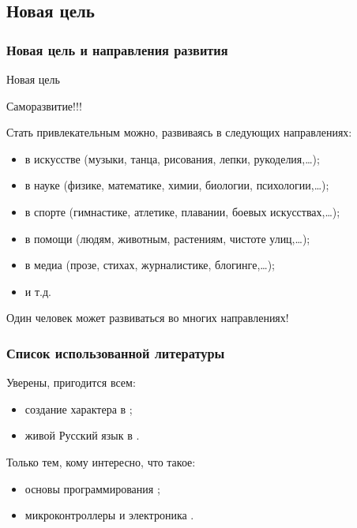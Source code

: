     
\subsection{Новая цель}

\begin{frame}
    \frametitle{Новая цель и направления развития}
    
    \begin{block}{Новая цель}
        \begin{center}
            \alert{Саморазвитие}!!!
        \end{center}
    \end{block}
    
    Стать \alert{привлекательным} можно, развиваясь в следующих направлениях:
    \begin{itemize}
        \item в искусстве (музыки, танца, рисования, лепки, рукоделия,\ldots);
        \item в науке (физике, математике, химии, биологии, психологии,\ldots);
        \item в спорте (гимнастике, атлетике, плавании, боевых искусствах,\ldots);
        \item в помощи (людям, животным, растениям, чистоте улиц,\ldots);
        \item в медиа (прозе, стихах, журналистике, блогинге,\ldots);
        \item и т.д.
    \end{itemize}
    
    \begin{block}{}
        \begin{center}
            \alert{Один} человек может развиваться во \alert{многих} направлениях!
        \end{center}
    \end{block}
    
\end{frame}


\appendix

\begin{frame}
    \frametitle{Список использованной литературы}

    Уверены, пригодится \alert{всем}:
    \begin{itemize}
        \item создание характера в \cite{bib:kovey:sevenHabits};
        \item живой Русский язык в \cite{bib:gal:WordLiveAndDeath}.
    \end{itemize}
    
    \par\bigskip
    
    Только тем, кому интересно, что такое:
    \begin{itemize}
        \item основы программирования \cite{bib:kernigan:practice};
        \item микроконтроллеры и электроника \cite{bib:petin:Arduino}.
    \end{itemize}
\end{frame}

